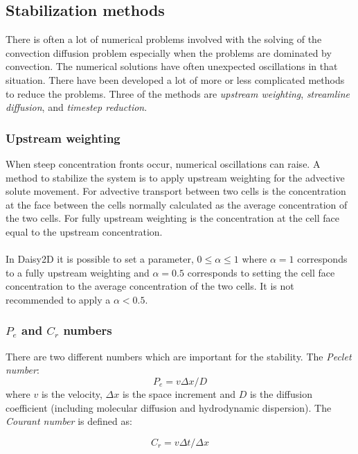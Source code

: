 \documentclass{report}
\begin{document}
\subsection{Stabilization methods}

There is often a lot of numerical problems involved with the solving
of the convection diffusion problem especially when the problems
are dominated by convection. The numerical solutions have often
unexpected oscillations in that situation. There have been developed
a lot of more or less complicated methods to reduce the problems.
Three of the methods are \textit{upstream weighting},
\textit{streamline diffusion}, and \textit{timestep reduction}.



\subsubsection{Upstream weighting}

When steep concentration fronts occur, numerical oscillations can
raise. A method to stabilize the system is to apply upstream
weighting for the advective solute movement. For advective
transport between two cells is the concentration at the face
between the cells normally calculated as the average concentration
of the two cells. For fully upstream weighting is the concentration at
the cell face equal to the upstream concentration. \\
\\
In Daisy2D it is possible to set a parameter,  $0\leq \alpha \leq 1$
where $\alpha=1$ corresponds to a fully upstream weighting and
$\alpha=0.5$ corresponds to setting the cell face concentration to
the average concentration of the two cells. It is not recommended
to apply a $\alpha<0.5$.


\subsubsection{$P_e$ and $C_r$ numbers}

There are two different numbers which are important for the
stability. The \textit{Peclet number}:
%
\begin{equation}
P_e=v\Delta x/D
\label{eq:Peclet}
\end{equation}
%
where $v$ is the velocity, $\Delta x$ is the
 space increment and $D$ is the diffusion coefficient (including
molecular diffusion and hydrodynamic dispersion). The
\textit{Courant number} is defined as:

\begin{equation}
C_r=v\Delta t/\Delta x
\label{eq:Courant}
\end{equation}
\end{document}
